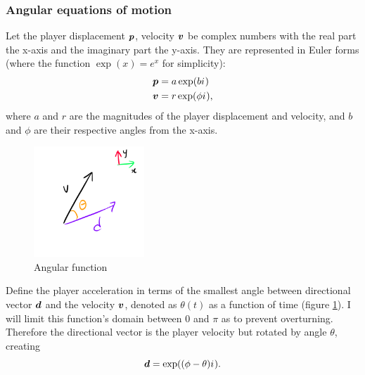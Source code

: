 
\subsubsection{Angular equations of motion}
Let the player displacement $\boldsymbol{p}$, velocity $\boldsymbol{v}$ be complex numbers with the real part the x-axis and the imaginary part the y-axis. They are represented in Euler forms (where the function $\exp(x)= e^{x}$ for simplicity):
\begin{align*}
    \boldsymbol{p} &= a \exp(b {i\mkern1mu})\\
    \boldsymbol{v} &= r \exp(\phi {i\mkern1mu}),
\end{align*}
where $a$ and $r$ are the magnitudes of the player displacement and velocity, and $b$ and $\phi$ are their respective angles from the x-axis.



\begin{figure}
    \includegraphics[width=0.37\textwidth,right]{assets/angular_freedom.png}
    \caption{Angular function}
    \label{fig:angular_freedom}
\end{figure}
Define the player acceleration in terms of the smallest angle between directional vector $\boldsymbol{d}$ and the velocity $\boldsymbol{v}$, denoted as $\theta(t)$ as a function of time (figure \ref{fig:angular_freedom}). I will limit this function's domain between $0$ and $\pi$ as to prevent overturning. Therefore the directional vector is the player velocity but rotated by angle $\theta$, creating
\[
\boldsymbol{d} = \exp((\phi - \theta) {i\mkern1mu}).
\]


